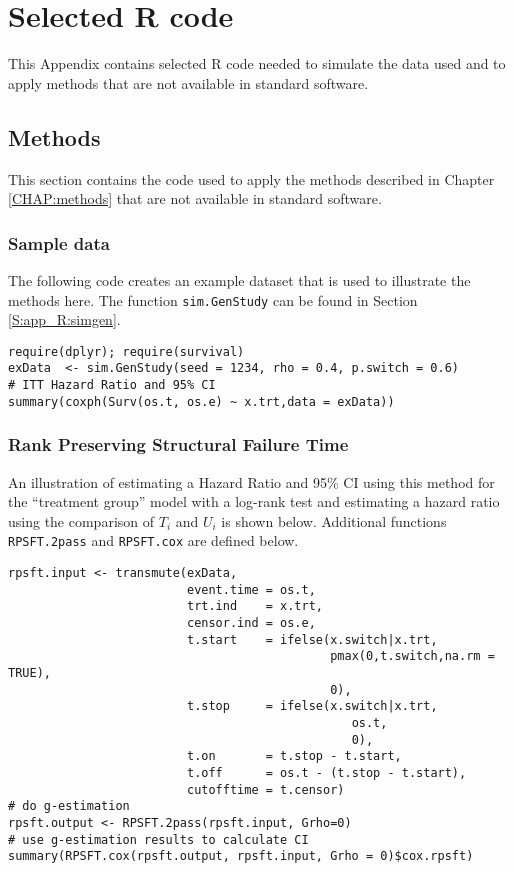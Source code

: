 \chapter{Selected R code}

\label{C:app_R}
This Appendix contains selected R \citep{Rsoftware} code needed to simulate the data used and to apply methods that are not available in standard software.

\section{Methods}
\label{S:app_R:sim1meth}
This section contains the code used to apply the methods described in Chapter \ref{CHAP:methods} that are not available in standard software.
\subsection{Sample data}
The following code creates an example dataset that is used to illustrate the methods here. The function \verb+sim.GenStudy+ can be found in Section \ref{S:app_R:simgen}.
\begin{Verbatim}[fontsize=\small, baselinestretch=0.75]
require(dplyr); require(survival)
exData  <- sim.GenStudy(seed = 1234, rho = 0.4, p.switch = 0.6)
# ITT Hazard Ratio and 95% CI
summary(coxph(Surv(os.t, os.e) ~ x.trt,data = exData))
\end{Verbatim}
\subsection{Rank Preserving Structural Failure Time}
An illustration of estimating a Hazard Ratio and 95\% CI using this method for the ``treatment group'' model with a log-rank test and estimating a hazard ratio using the comparison of $T_i$ and $U_i$ is shown below. Additional functions \verb+RPSFT.2pass+ and \verb+RPSFT.cox+ are defined below. 

\begin{Verbatim}[fontsize=\small, baselinestretch=0.75]
rpsft.input <- transmute(exData, 
                         event.time = os.t,
                         trt.ind    = x.trt, 
                         censor.ind = os.e, 
                         t.start    = ifelse(x.switch|x.trt, 
                                             pmax(0,t.switch,na.rm = TRUE), 
                                             0),
                         t.stop     = ifelse(x.switch|x.trt, 
                                                os.t, 
                                                0),
                         t.on       = t.stop - t.start, 
                         t.off      = os.t - (t.stop - t.start),
                         cutofftime = t.censor)
# do g-estimation
rpsft.output <- RPSFT.2pass(rpsft.input, Grho=0)
# use g-estimation results to calculate CI
summary(RPSFT.cox(rpsft.output, rpsft.input, Grho = 0)$cox.rpsft)
\end{Verbatim}

